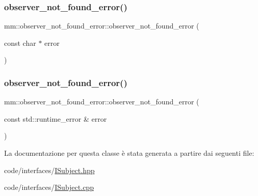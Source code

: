 \subsubsection{\texorpdfstring{observer\+\_\+not\+\_\+found\+\_\+error()}{observer\_not\_found\_error()}\hspace{0.1cm}{\footnotesize\ttfamily [2/3]}}
{\footnotesize\ttfamily mm\+::observer\+\_\+not\+\_\+found\+\_\+error\+::observer\+\_\+not\+\_\+found\+\_\+error (\begin{DoxyParamCaption}\item[{const char $\ast$}]{error }\end{DoxyParamCaption})}

\mbox{\label{classmm_1_1observer__not__found__error_a60ab7d1412fcd906c7976e686f9b936b}} 
\subsubsection{\texorpdfstring{observer\+\_\+not\+\_\+found\+\_\+error()}{observer\_not\_found\_error()}\hspace{0.1cm}{\footnotesize\ttfamily [3/3]}}
{\footnotesize\ttfamily mm\+::observer\+\_\+not\+\_\+found\+\_\+error\+::observer\+\_\+not\+\_\+found\+\_\+error (\begin{DoxyParamCaption}\item[{const std\+::runtime\+\_\+error \&}]{error }\end{DoxyParamCaption})}



La documentazione per questa classe è stata generata a partire dai seguenti file\+:\begin{DoxyCompactItemize}
\item 
code/interfaces/\mbox{\hyperlink{_i_subject_8hpp}{I\+Subject.\+hpp}}\item 
code/interfaces/\mbox{\hyperlink{_i_subject_8cpp}{I\+Subject.\+cpp}}\end{DoxyCompactItemize}
